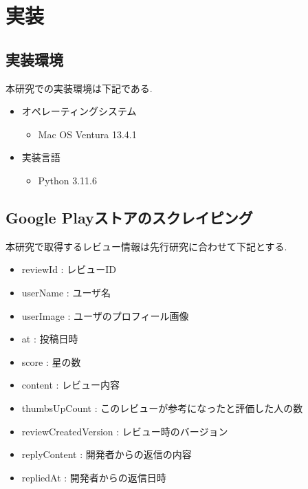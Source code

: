 \chapter{実装}
\label{chap:zisso}


\section{実装環境}
本研究での実装環境は下記である. 

\begin{itemize}
 \item オペレーティングシステム
    \begin{itemize}
      \item Mac OS Ventura 13.4.1
    \end{itemize}
 \item 実装言語
    \begin{itemize}
      \item Python 3.11.6
    \end{itemize}
\end{itemize}


\section{Google Playストアのスクレイピング}
本研究で取得するレビュー情報は先行研究\cite{kawatsura}に合わせて下記とする. 

\begin{itemize}
 \item reviewId : レビューID
 \item userName : ユーザ名
 \item userImage : ユーザのプロフィール画像
 \item at : 投稿日時
 \item score : 星の数
 \item content : レビュー内容
 \item thumbsUpCount : このレビューが参考になったと評価した人の数
 \item reviewCreatedVersion : レビュー時のバージョン
 \item replyContent : 開発者からの返信の内容
 \item repliedAt : 開発者からの返信日時
\end{itemize}

